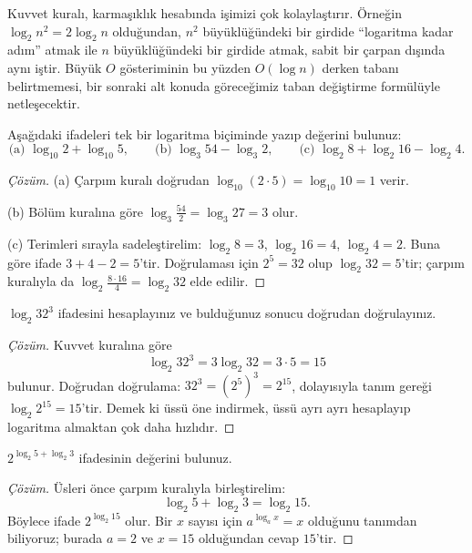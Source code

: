 \begin{remark}
Kuvvet kuralı, karmaşıklık hesabında işimizi çok kolaylaştırır. Örneğin $\log_2 n^2 = 2 \log_2 n$ olduğundan, $n^2$ büyüklüğündeki bir girdide ``logaritma kadar adım'' atmak ile $n$ büyüklüğündeki bir girdide atmak, sabit bir çarpan dışında aynı iştir. Büyük $O$ gösteriminin bu yüzden $O(\log n)$ derken tabanı belirtmemesi, bir sonraki alt konuda göreceğimiz taban değiştirme formülüyle netleşecektir.
\end{remark}

\begin{example}
Aşağıdaki ifadeleri tek bir logaritma biçiminde yazıp değerini bulunuz:
\[
\text{(a) } \log_{10} 2 + \log_{10} 5, \qquad \text{(b) } \log_3 54 - \log_3 2, \qquad \text{(c) } \log_2 8 + \log_2 16 - \log_2 4.
\]
\end{example}

\begin{proof}[Çözüm]
(a) Çarpım kuralı doğrudan $\log_{10}(2 \cdot 5) = \log_{10} 10 = 1$ verir.

(b) Bölüm kuralına göre $\log_3 \frac{54}{2} = \log_3 27 = 3$ olur.

(c) Terimleri sırayla sadeleştirelim: $\log_2 8 = 3$, $\log_2 16 = 4$, $\log_2 4 = 2$. Buna göre ifade $3 + 4 - 2 = 5$'tir. Doğrulaması için $2^5 = 32$ olup $\log_2 32 = 5$'tir; çarpım kuralıyla da $\log_2 \frac{8 \cdot 16}{4} = \log_2 32$ elde edilir.
\end{proof}

\begin{example}
$\log_2 32^3$ ifadesini hesaplayınız ve bulduğunuz sonucu doğrudan doğrulayınız.
\end{example}

\begin{proof}[Çözüm]
Kuvvet kuralına göre
\[
\log_2 32^3 = 3 \log_2 32 = 3 \cdot 5 = 15
\]
bulunur. Doğrudan doğrulama: $32^3 = (2^5)^3 = 2^{15}$, dolayısıyla tanım gereği $\log_2 2^{15} = 15$'tir. Demek ki üssü öne indirmek, üssü ayrı ayrı hesaplayıp logaritma almaktan çok daha hızlıdır.
\end{proof}

\begin{example}
$2^{\log_2 5 + \log_2 3}$ ifadesinin değerini bulunuz.
\end{example}

\begin{proof}[Çözüm]
Üsleri önce çarpım kuralıyla birleştirelim:
\[
\log_2 5 + \log_2 3 = \log_2 15.
\]
Böylece ifade $2^{\log_2 15}$ olur. Bir $x$ sayısı için $a^{\log_a x} = x$ olduğunu tanımdan biliyoruz; burada $a = 2$ ve $x = 15$ olduğundan cevap $15$'tir.
\end{proof}

